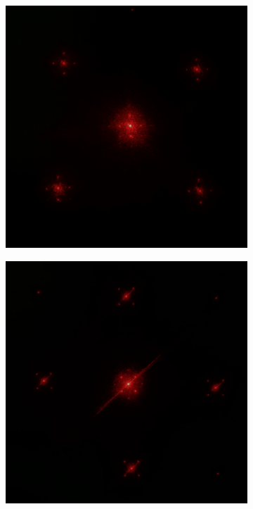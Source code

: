 \documentclass[a4paper]{article}
\begin{document}
\begin{figure}[H]
\begin{subfigure}[t]{0.3\textwidth}
        \includegraphics[width=\textwidth]{phone-img/11.jpg}
        \caption{}
        \label{fig8-4}
    \end{subfigure}
    \begin{subfigure}[t]{0.3\textwidth}
        \centering
        \includegraphics[width=\textwidth]{phone-img/8.jpg}

\end{subfigure}
\end{figure}
\end{document}

